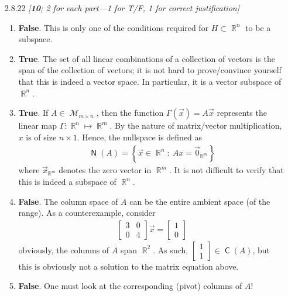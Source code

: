 \documentclass{amsart}
\theoremstyle{definition}
\theoremstyle{definition}
\DeclareMathOperator{\R}{\mathbb{R}}
\DeclareMathOperator{\1}{\mathbbm{1}}
\DeclareMathOperator{\MM}{\mathcal{M}}
\DeclareMathOperator{\col}{\mathsf{C}}
\DeclareMathOperator{\nul}{\mathsf{N}}
\newcommand{\condset}[4]{\left\{ #1  : \: #2 #3 #4 \right\}}
\begin{document}
\begin{enumerate}[itemsep = 2mm]
		\item[2.8.22] \textit{[\textbf{10}; 2 for each part---1 for T/F, 1 for correct justification]}
		
		\begin{enumerate}
			\item \textbf{False}. This is only one of the conditions required for $H \subset \R^n$ to be a subspace.
			
			\item \textbf{True}. The set of all linear combinations of a collection of vectors is the span of the collection of vectors; it is not hard to prove/convince yourself that this is indeed a vector space. In particular, it is a vector subspace of $\R^n$.
			
			\item \textbf{True}. If $A \in \MM_{m\times n}$, then the function $\Gamma(\vec{x}) = A\vec{x}$ represents the linear map $\Gamma : \R^n \mapsto \R^m$. By the nature of matrix/vector multiplication, $x$ is of size $n \times 1$. Hence, the nullspace is defined as
			\begin{align*}
			\nul(A) = \condset{\vec{x} \in \R^n}{Ax}{=}{\vec{0}_{\R^m}}
			\end{align*}
			where $\vec{x}_{\R^m}$ denotes the zero vector in $\R^m$. It is not difficult to verify that this is indeed a subspace of $\R^n$.
			
			\item \textbf{False}. The column space of $A$ can be the entire ambient space (of the range). As a counterexample, consider
			\begin{align*}
			\begin{bmatrix}
			3 & 0 \\ 0 & 4
			\end{bmatrix} \vec{x} = \begin{bmatrix}
			1 \\ 0
			\end{bmatrix}
			\end{align*}
			obviously, the columns of $A$ span $\R^2$. As such, $\begin{bmatrix}
			1 \\ 1
			\end{bmatrix} \in \col(A)$, but this is obviously not a solution to the matrix equation above.
			
			\item \textbf{False}. One must look at the corresponding (pivot) columns of $A$!
		\end{enumerate}
		

\end{enumerate}
\end{document}
